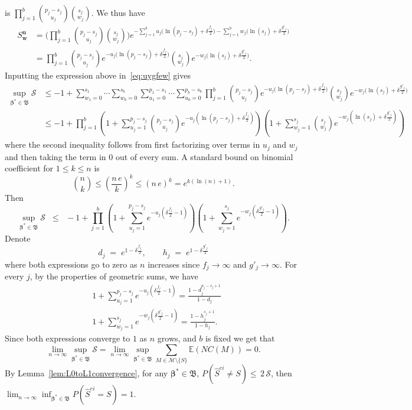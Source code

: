 \documentclass[
  12pt]{article}
\newcommand{\E}{\mathbb{E}}
\newcommand{\M}{\mathcal{M}}
\newcommand{\bu}{\mathbf{u}}
\newcommand{\bw}{\mathbf{w}}
\newcommand{\bbeta}{\boldsymbol{\beta}}
\newcommand{\bB}{\mathfrak{B}}
\begin{document}
is $\prod_{j=1}^b {\binom{p_j-s_j}{u_j}}{\binom{s_j}{w_j}}$. We thus have
\begin{align*}
    S^{\bu}_{\bw}&= \bigg(\prod_{j=1}^b {\binom{p_j-s_j}{u_j}}{\binom{s_j}{w_j}}\bigg)e^{- \sum_{j=1}^b u_j\big(\ln(p_j-s_j)+\delta \tfrac{f_j}{2}\big)-\sum_{j=1}^b w_j\big(\ln(s_j)+\delta \tfrac{g'_j}{2}\big)} \\
    &= \prod_{j=1}^b {\binom{p_j-s_j}{u_j}}e^{- u_j\big(\ln(p_j-s_j)+\delta \tfrac{f_j}{2}\big)}{\binom{s_j}{w_j}}e^{-w_j\big(\ln(s_j)+\delta \tfrac{g'_j}{2}\big)}.
\end{align*}
Inputting the expression above in~\eqref{eq:uygfew} gives
\begin{align*}
    \sup_{\bbeta^*\in \bB} \mathcal{S} 
    &\leq -1+\sum_{w_1=0}^{s_1}\cdots\sum_{w_b=0}^{s_b}\sum_{u_1=0}^{p_1-s_1}\cdots\sum_{u_b=0}^{p_b-s_b}\prod_{j=1}^b {\binom{p_j-s_j}{u_j}}e^{- u_j\big(\ln(p_j-s_j)+\delta \tfrac{f_j}{2}\big)}{\binom{s_j}{w_j}}e^{-w_j\big(\ln(s_j)+\delta \tfrac{g'_j}{2}\big)}\\
    &\leq - 1 + \prod_{j=1}^b\left(1+\sum_{u_j=1}^{p_j-s_j}{\binom{p_j-s_j}{u_j}}e^{- u_j(\ln(p_j-s_j)+\delta \tfrac{f_j}{2})}\right)\left(1+
    \sum_{w_j=1}^{s_j}{\binom{s_j}{w_j}}
    e^{-w_j(\ln(s_j)+\delta \tfrac{g'_j}{2})}\right) 
\end{align*}
where the second inequality follows from first factorizing over terms in $u_j$ and $w_j$ and then taking the term in 0 out of every sum. A standard bound on binomial coefficient for $1\leq k\leq n$ is
\begin{equation}\label{eq:upperboudbinom}
    \binom{n}{k} \leq \left(\frac{n\,e}{k}\right)^k \leq \left(n\,e\right)^k = e^{k(\ln(n)+1)}.
\end{equation}
Then
\begin{equation}\label{eq:upperbound_sumprob}
    \sup_{\bbeta^*\in \bB} \mathcal{S} \;\;\leq\;\; - 1+\prod_{j=1}^b\left(1+\sum_{u_j=1}^{p_j-s_j}e^{-u_j\left(\delta \tfrac{f_j}{2}-1\right)}\right)\left(1+
    \sum_{w_j=1}^{s_j}    e^{-w_j\left(\delta \tfrac{g'_j}{2}-1\right)}\right).
\end{equation}
Denote
$$
d_j\;=\;e^{1-\delta \tfrac{f_j}{2}},\qquad h_j\;=\;e^{1-\delta \tfrac{g'_j}{2}}
$$
where both expressions go to zero as $n$ increases since $f_j\to\infty$ and $g'_j\to\infty$.
For every $j$, by the properties of geometric sums, we have
\begin{align*}
    &1+\sum_{u_j=1}^{p_j-s_j}e^{-u_j\left(\delta \tfrac{f_j}{2}-1\right)}
    =\frac{1-d_j^{p_j-s_j+1}}{1-d_j} \\
    &1+\sum_{w_j=1}^{s_j}    e^{-w_j\left(\delta \tfrac{g'_j}{2}-1\right)} =\frac{1-h_j^{s_j+1}}{1-h_j}.
\end{align*}
Since both expressions converge to $1$ as $n$ grows, and $b$ is fixed we get that
\begin{equation}\label{eq:NPFENK}
\lim_{n \to \infty} \sup_{\bbeta^*\in \bB} \mathcal{S}=\lim_{n \to \infty} \sup_{\bbeta^*\in \bB}\sum_{M \in \M\setminus \{S\}}\E\left(NC(M)\right)= 0.
\end{equation}
By Lemma~\ref{lem:L0toL1convergence}, for any $\bbeta^*\in \bB$, $P(\hat{S}^{ei}\neq S)\leq \,2\, \mathcal{S}$, then $\lim_{n \to \infty} \inf_{\bbeta^*\in \bB}P(\hat{S}^{ei}= S)=1$.
\end{document}

